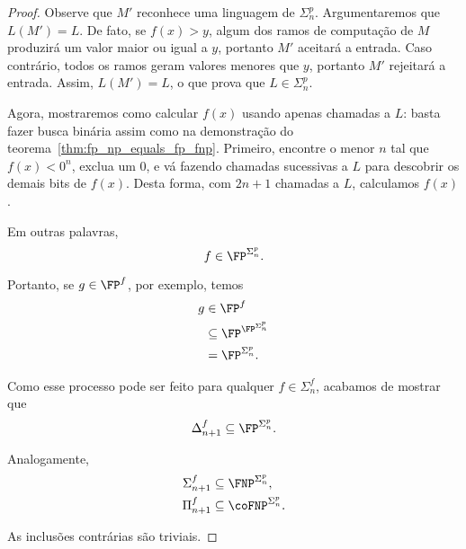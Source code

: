 \begin{proof}
    Observe que $M'$ reconhece uma linguagem de $\Sigma_n^p$.
    Argumentaremos que $L(M') = L$.
    De fato, se $f(x) > y$,
    algum dos ramos de computação de $M$ produzirá um valor maior ou igual a $y$,
    portanto $M'$ aceitará a entrada.
    Caso contrário,
    todos os ramos geram valores menores que $y$,
    portanto $M'$ rejeitará a entrada.
    Assim, $L(M') = L$,
    o que prova que $L \in \Sigma_n^p$.

    Agora,
    mostraremos como calcular $f(x)$ usando apenas chamadas a $L$:
    basta fazer busca binária assim como na demonstração
    do teorema~\ref{thm:fp_np_equals_fp_fnp}.
    Primeiro,
    encontre o menor $n$ tal que $f(x) < 0^n$,
    exclua um $0$,
    e vá fazendo chamadas sucessivas a $L$ para descobrir os demais bits de $f(x)$.
    Desta forma, com $2n+1$ chamadas a $L$,
    calculamos $f(x)$.

    Em outras palavras,
    \begin{equation*}
        f \in \FP^{\Sigma_n^p}.
    \end{equation*}

    Portanto, se $g \in \FP^f$,
    por exemplo,
    temos
    \begin{align*}
        g &\in \FP^f \\
          &\subseteq \FP^{\FP^{\Sigma_n^p}} \\
          &= \FP^{\Sigma_n^p}.
    \end{align*}

    Como esse processo pode ser feito para qualquer $f \in \Sigma_n^f$,
    acabamos de mostrar que
    \begin{equation*}
        \Delta_{n+1}^f \subseteq \FP^{\Sigma_n^p}.
    \end{equation*}

    Analogamente,
    \begin{align*}
        \Sigma_{n+1}^f &\subseteq \FNP^{\Sigma_n^p},\\
        \Pi_{n+1}^f &\subseteq \coFNP^{\Sigma_n^p}.
    \end{align*}

    As inclusões contrárias são triviais.
\end{proof}

